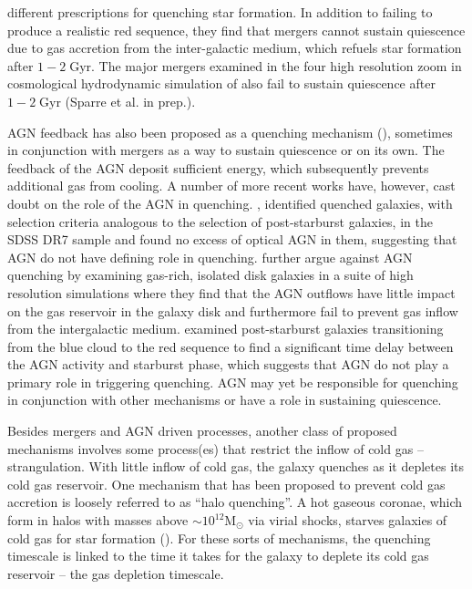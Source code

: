 different prescriptions for quenching star formation. In addition to failing 
to produce a realistic red sequence, they find that mergers cannot 
sustain quiescence due to gas accretion from the inter-galactic medium, which
refuels star formation after $1-2\;\mathrm{Gyr}$. The 
major mergers examined in the four high resolution zoom in cosmological 
hydrodynamic simulation of \cite{Sparre:2016aa} also fail to sustain 
quiescence after $1-2\;\mathrm{Gyr}$ (Sparre et al. in prep.).

AGN feedback has also been proposed as a quenching mechanism 
(\citealt{Kauffmann:2000aa, Croton:2006aa, Hopkins:2008ab,van-de-Voort:2011aa}), 
sometimes in conjunction with mergers as a way to sustain quiescence or on its
own. The feedback of the AGN deposit sufficient energy, which subsequently 
prevents additional gas from cooling. A number of more recent works have, 
however, cast doubt on the role of the AGN in quenching. \cite{Mendel:2013aa}, 
identified quenched galaxies, with selection criteria analogous to the 
selection of post-starburst galaxies, in the SDSS DR7 sample and found 
no excess of optical AGN in them, suggesting that AGN do not have 
defining role in quenching. \cite{Gabor:2014aa} further argue against AGN quenching 
by examining gas-rich, isolated disk galaxies in a suite of 
high resolution simulations where they find that the AGN outflows 
have little impact on the gas reservoir in the galaxy disk and 
furthermore fail to prevent gas inflow from the intergalactic medium.
\cite{Yesuf:2014aa} examined post-starburst galaxies transitioning from the 
blue cloud to the red sequence to find a significant time delay between the 
AGN activity and starburst phase, which suggests that AGN do not play a primary 
role in triggering quenching. AGN may yet be responsible for 
quenching in conjunction with other mechanisms or have a role 
in sustaining quiescence. 


Besides mergers and AGN driven processes, another class of 
proposed mechanisms involves some process(es) that restrict the 
inflow of cold gas -- strangulation. With little
inflow of cold gas, the galaxy quenches as it depletes its 
cold gas reservoir. One mechanism that has been proposed 
to prevent cold gas accretion is loosely referred to as ``halo quenching''. 
A hot gaseous coronae, which form in halos with masses above 
$\sim 10^{12}\mathrm{M}_\odot$ via virial shocks, starves 
galaxies of cold gas for star formation (\citealt{Birnboim:2003aa, 
Keres:2005aa, Cattaneo:2006aa, Dekel:2006aa, Birnboim:2007aa, Gabor:2012aa, 
Gabor:2015aa}). 
For these sorts of mechanisms, the quenching timescale is 
linked to the time it takes for the galaxy to deplete its cold gas 
reservoir -- the gas depletion timescale. 

